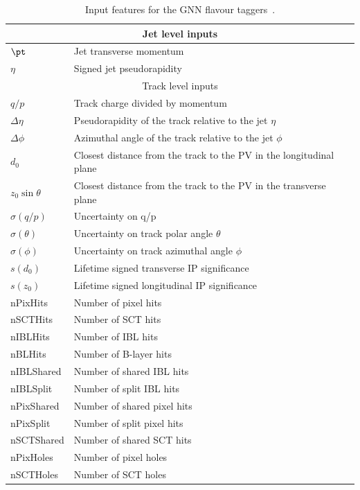 \begin{table}[h]
    \centering
    \begin{tabular}{ll}
        \toprule
        \midrule
        \multicolumn{2}{c}{Jet level inputs} \\
        \midrule
        $\pt$ & Jet transverse momentum \\
        $\eta$ & Signed jet pseudorapidity \\
        \midrule
        \midrule
        \multicolumn{2}{c}{Track level inputs} \\
        \midrule
        $q/p$ & Track charge divided by momentum \\
        $\Delta\eta$ & Pseudorapidity of the track relative to the jet $\eta$ \\
        $\Delta\phi$ & Azimuthal angle of the track relative to the jet $\phi$ \\
        $d_0$ & Closest distance from the track to the PV in the longitudinal plane \\
        $z_0 \sin \theta$ & Closest distance from the track to the PV in the transverse plane \\
        $\sigma(q/p)$ & Uncertainty on q/p \\
        $\sigma(\theta)$ & Uncertainty on track polar angle $\theta$ \\
        $\sigma(\phi)$ & Uncertainty on track azimuthal angle $\phi$ \\
        $s(d_0)$ & Lifetime signed transverse IP significance \\
        $s(z_0)$ & Lifetime signed longitudinal IP significance \\
        nPixHits & Number of pixel hits \\
        nSCTHits & Number of SCT hits \\
        nIBLHits & Number of IBL hits \\
        nBLHits & Number of B-layer hits \\
        nIBLShared & Number of shared IBL hits \\
        nIBLSplit & Number of split IBL hits \\
        nPixShared & Number of shared pixel hits \\
        nPixSplit & Number of split pixel hits \\
        nSCTShared & Number of shared SCT hits \\
        nPixHoles & Number of pixel holes \\
        nSCTHoles & Number of SCT holes \\
        \bottomrule
    \end{tabular}
    \caption{Input features for the GNN flavour taggers~\cite{GN1}.}
    \label{tab:track_features}
\end{table}

